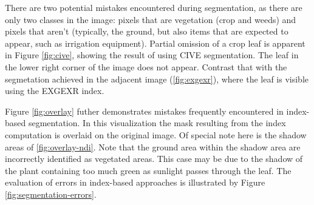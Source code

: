 \documentclass[letterpaper, notitlepage]{report}
\begin{document}
{There are two potential mistakes encountered during segmentation, as there are only two classes in the image: pixels that are vegetation (crop and weeds) and pixels that aren't (typically, the ground, but also items that are expected to appear, such as irrigation equipment). Partial omission of a crop leaf is apparent in Figure \ref{fig:cive}, showing the result of using \gls{CIVE} segmentation.  The leaf in the lower right corner of the image does not appear. Contrast that with the segmetation achieved in the adjacent image (\ref{fig:exgexr}), where the leaf is visible using the \gls{EXGEXR} index. 

Figure \ref{fig:overlay} futher demonstrates mistakes frequently encountered in index-based segmentation.  In this visualization the mask resulting from the index computation is overlaid on the original  image. Of special note here is the shadow areas of \ref{fig:overlay-ndi}.  Note that the ground area within the shadow area are incorrectly identified as vegetated areas. This case may be due to the shadow of the plant containing too much green as sunlight passes through the leaf. The evaluation of errors in index-based approaches is illustrated by Figure \ref{fig:segmentation-errors}.

}
\end{document}

